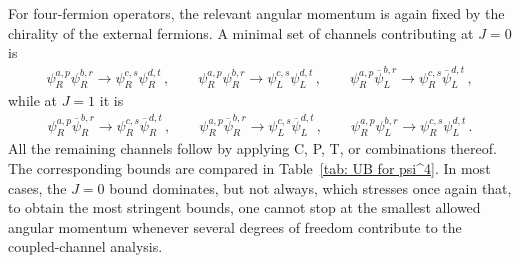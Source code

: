 For four-fermion operators, the relevant angular momentum is again fixed by the chirality of the
external fermions. A minimal set of channels contributing at $J=0$ is
\begin{gather}
    \psi_R^{a,p}\psi_R^{b,r}\to\psi_R^{c,s}\psi_R^{d,t}\,,\qquad
    \psi_R^{a,p}\psi_R^{b,r}\to\psi_L^{c,s}\psi_L^{d,t}\,,\qquad
    \psi_R^{a,p}\overline\psi_L^{b,r}\to\psi_R^{c,s}\overline\psi_L^{d,t}\,,
\end{gather}
while at $J=1$ it is
\begin{gather}
    \psi_R^{a,p}\overline\psi_R^{b,r}\to\psi_R^{c,s}\overline\psi_R^{d,t}\,,\qquad
    \psi_R^{a,p}\overline\psi_R^{b,r}\to\psi_L^{c,s}\overline\psi_L^{d,t}\,,\qquad
    \psi_R^{a,p}\psi_L^{b,r}\to\psi_R^{c,s}\psi_L^{d,t}\,.
\end{gather}
All the remaining channels follow by applying C, P, T, or
combinations thereof.
The corresponding bounds are compared in Table~\ref{tab: UB for psi^4}. In most cases, the $J=0$ bound
dominates, but not always, which stresses once again that, to obtain the most stringent bounds, one cannot stop at the smallest allowed
angular momentum whenever several degrees of freedom contribute to the coupled-channel analysis.



